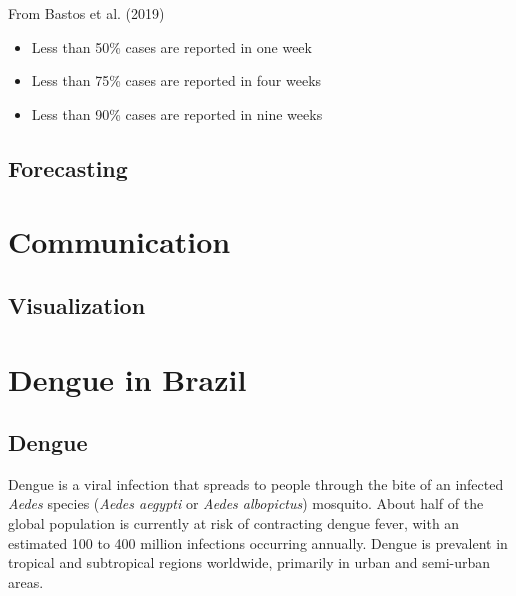 \documentclass[
  letterpaper,
  DIV=11,
  numbers=noendperiod]{scrreprt}
\providecommand{\tightlist}{%
  \setlength{\itemsep}{0pt}\setlength{\parskip}{0pt}}\usepackage{longtable,booktabs,array}
\begin{document}
From Bastos et al. (2019)

\begin{itemize}
\tightlist
\item
  Less than 50\% cases are reported in one week
\item
  Less than 75\% cases are reported in four weeks
\item
  Less than 90\% cases are reported in nine weeks
\end{itemize}

\hypertarget{forecasting}{%
\chapter{Forecasting}\label{forecasting}}

\part{Communication}

\hypertarget{visualization}{%
\chapter{Visualization}\label{visualization}}

\part{Dengue in Brazil}

\hypertarget{dengue}{%
\chapter{Dengue}\label{dengue}}

Dengue is a viral infection that spreads to people through the bite of
an infected \emph{Aedes} species (\emph{Aedes aegypti} or \emph{Aedes
albopictus}) mosquito. About half of the global population is currently
at risk of contracting dengue fever, with an estimated 100 to 400
million infections occurring annually. Dengue is prevalent in tropical
and subtropical regions worldwide, primarily in urban and semi-urban
areas.
\end{document}
